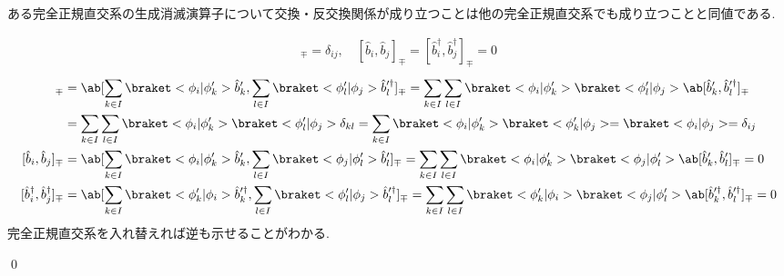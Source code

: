\documentclass[uplatex,dvipdfmx,a4paper,11pt]{jlreq}
\makeatletter
\numberwithin{equation}{section}
\theoremstyle{definition}
\renewenvironment{proof}[1][\proofname]{\par
  \normalfont
  \topsep6\p@\@plus6\p@ \trivlist
  \item[\hskip\labelsep{\bfseries #1}\@addpunct{\bfseries}]\ignorespaces\quad\par
}{
  \qed\endtrivlist\@endpefalse
}
\renewcommand\proofname{証明}
\makeatother
\begin{document}
\begin{proposition}[Q21-80]
  ある完全正規直交系の生成消滅演算子について交換・反交換関係が成り立つことは他の完全正規直交系でも成り立つことと同値である.
\end{proposition}
\begin{proof}
  \begin{align}
    [\hat{b}_i, \hat{b}_j^\dagger]_\mp = \delta_{ij}, \quad [\hat{b}_i, \hat{b}_j]_\mp = [\hat{b}_i^\dagger, \hat{b}_j^\dagger]_\mp = 0
  \end{align}
  \begin{align}
    [\hat{b}_i, \hat{b}_j^\dagger]_\mp         & = \ab[\sum_{k\in I}\braket<\phi_i|\phi_k'>\hat{b}_k', \sum_{l\in I}\braket<\phi_l'|\phi_j>\hat{b}_l^{\prime\dagger}]_\mp = \sum_{k\in I}\sum_{l\in I}\braket<\phi_i|\phi_k'>\braket<\phi_l'|\phi_j>\ab[\hat{b}_k', \hat{b}_l^{\prime\dagger}]_\mp                                   \\
                                               & = \sum_{k\in I}\sum_{l\in I}\braket<\phi_i|\phi_k'>\braket<\phi_l'|\phi_j>\delta_{kl} = \sum_{k\in I}\braket<\phi_i|\phi_k'>\braket<\phi_k'|\phi_j> = \braket<\phi_i|\phi_j> = \delta_{ij}                                                                                          \\
    [\hat{b}_i, \hat{b}_j]_\mp                 & = \ab[\sum_{k\in I}\braket<\phi_i|\phi_k'>\hat{b}_k', \sum_{l\in I}\braket<\phi_j|\phi_l'>\hat{b}_l']_\mp = \sum_{k\in I}\sum_{l\in I}\braket<\phi_i|\phi_k'>\braket<\phi_j|\phi_l'>\ab[\hat{b}_k', \hat{b}_l']_\mp = 0                                                             \\
    [\hat{b}_i^\dagger, \hat{b}_j^\dagger]_\mp & = \ab[\sum_{k\in I}\braket<\phi_k'|\phi_i>\hat{b}_k^{\prime\dagger}, \sum_{l\in I}\braket<\phi_l'|\phi_j>\hat{b}_l^{\prime\dagger}]_\mp = \sum_{k\in I}\sum_{l\in I}\braket<\phi_k'|\phi_i>\braket<\phi_j|\phi_l'>\ab[\hat{b}_k^{\prime\dagger}, \hat{b}_l^{\prime\dagger}]_\mp = 0
  \end{align}
  完全正規直交系を入れ替えれば逆も示せることがわかる.
\end{proof}
\end{document}
